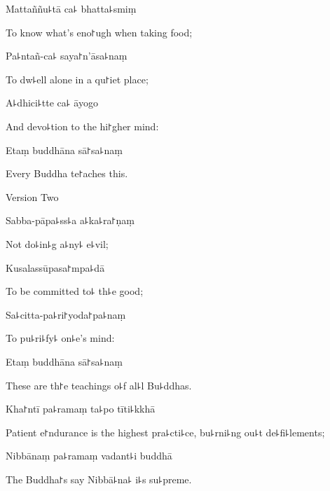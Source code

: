 Mattaññu꜕tā ca꜕ bhatta꜕smiṃ

\begin{english}
  To know what's eno꜓ugh when taking food;
\end{english}

Pa꜕ntañ-ca꜕ saya꜓n'āsa꜕naṃ

\begin{english}
  To dw꜕ell alone in a qu꜓iet place;
\end{english}

A꜕dhici꜕tte ca꜕ āyogo

\begin{english}
  And devo꜕tion to the hi꜓gher mind:
\end{english}

Etaṃ buddhāna sā꜓sa꜕naṃ

\begin{english}
  Every Buddha te꜓aches this.
\end{english}

\begin{instruction}
  Version Two
\end{instruction}

Sabba-pāpa꜕ss꜕a a꜕ka꜕ra꜓ṇaṃ

\begin{english}
  Not do꜕in꜕g a꜕ny꜕ e꜕vil;
\end{english}

Kusalassūpasa꜓mpa꜕dā

\begin{english}
  To be committed to꜕ th꜕e good;
\end{english}

Sa꜕citta-pa꜕ri꜓yoda꜓pa꜕naṃ

\begin{english}
  To pu꜕ri꜕fy꜕ on꜕e's mind:
\end{english}

Etaṃ buddhāna sā꜓sa꜕naṃ

\begin{english}
  These are th꜓e teachings o꜕f al꜕l Bu꜕ddhas.
\end{english}

Kha꜓ntī pa꜕ramaṃ ta꜕po tīti꜕kkhā

\begin{english}
  Patient e꜓ndurance is the highest pra꜕cti꜕ce, bu꜕rni꜕ng ou꜕t de꜕fi꜕lements;
\end{english}

Nibbānaṃ pa꜕ramaṃ vadant꜕i buddhā

\begin{english}
  The Buddha꜓s say Nibbā꜕na꜕ i꜕s su꜕preme.
\end{english}

